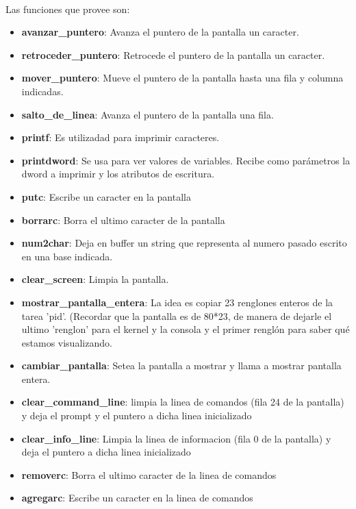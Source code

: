 \documentclass[11pt, a4paper]{article}
\begin{document}
	\paragraph{}
	Las funciones que provee son:
	\begin{itemize} 
		\item \textbf{avanzar\_puntero}: Avanza el puntero de la pantalla un caracter. 
		\item \textbf{retroceder\_puntero}: Retrocede el puntero de la pantalla un caracter. 
		\item \textbf{mover\_puntero}: Mueve el puntero de la pantalla hasta una fila y columna indicadas. 
		\item \textbf{salto\_de\_linea}: Avanza el puntero de la pantalla una fila. 
		\item \textbf{printf}: Es utilizadad para imprimir caracteres.
		\item \textbf{printdword}: Se usa para ver valores de variables. Recibe como parámetros la dword a imprimir y los atributos de escritura.
		\item \textbf{putc}: Escribe un caracter en la pantalla 
		\item \textbf{borrarc}: Borra el ultimo caracter de la pantalla 
		\item \textbf{num2char}: Deja en buffer un string que representa al numero pasado escrito en una base indicada. 
		\item \textbf{clear\_screen}: Limpia la pantalla. 
		\item \textbf{mostrar\_pantalla\_entera}: La idea es copiar 23 renglones enteros de la tarea 'pid'. (Recordar que la pantalla es de 80*23, de manera de dejarle el ultimo 'renglon' para el kernel y la consola y el primer renglón para saber qué estamos visualizando.
		\item \textbf{cambiar\_pantalla}: Setea la pantalla a mostrar y llama a mostrar pantalla entera.
		\item \textbf{clear\_command\_line}: limpia la linea de comandos (fila 24 de la pantalla) y deja el prompt y el puntero a dicha linea inicializado 
		\item \textbf{clear\_info\_line}: Limpia la linea de informacion (fila 0 de la pantalla) y deja el puntero a dicha linea inicializado 
		\item \textbf{removerc}: Borra el ultimo caracter de la linea de comandos 
		\item \textbf{agregarc}: Escribe un caracter en la linea de comandos
	\end{itemize}
\end{document}
